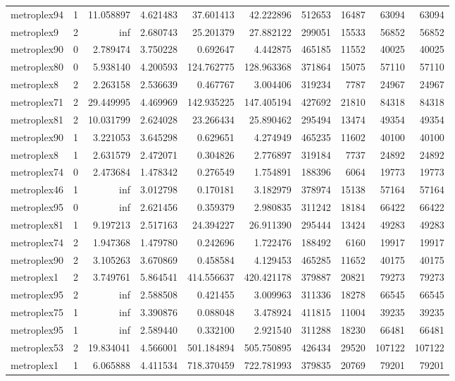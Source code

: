 \begin{longtable}{|l|r|r|r|r|r|r|r|r|r|}
metroplex94 & 1 & 11.058897 & 4.621483 & 37.601413 & 42.222896 & 512653 & 16487 & 63094 & 63094 \\
metroplex9 & 2 & inf & 2.680743 & 25.201379 & 27.882122 & 299051 & 15533 & 56852 & 56852 \\
metroplex90 & 0 & 2.789474 & 3.750228 & 0.692647 & 4.442875 & 465185 & 11552 & 40025 & 40025 \\
metroplex80 & 0 & 5.938140 & 4.200593 & 124.762775 & 128.963368 & 371864 & 15075 & 57110 & 57110 \\
metroplex8 & 2 & 2.263158 & 2.536639 & 0.467767 & 3.004406 & 319234 & 7787 & 24967 & 24967 \\
metroplex71 & 2 & 29.449995 & 4.469969 & 142.935225 & 147.405194 & 427692 & 21810 & 84318 & 84318 \\
metroplex81 & 2 & 10.031799 & 2.624028 & 23.266434 & 25.890462 & 295494 & 13474 & 49354 & 49354 \\
metroplex90 & 1 & 3.221053 & 3.645298 & 0.629651 & 4.274949 & 465235 & 11602 & 40100 & 40100 \\
metroplex8 & 1 & 2.631579 & 2.472071 & 0.304826 & 2.776897 & 319184 & 7737 & 24892 & 24892 \\
metroplex74 & 0 & 2.473684 & 1.478342 & 0.276549 & 1.754891 & 188396 & 6064 & 19773 & 19773 \\
metroplex46 & 1 & inf & 3.012798 & 0.170181 & 3.182979 & 378974 & 15138 & 57164 & 57164 \\
metroplex95 & 0 & inf & 2.621456 & 0.359379 & 2.980835 & 311242 & 18184 & 66422 & 66422 \\
metroplex81 & 1 & 9.197213 & 2.517163 & 24.394227 & 26.911390 & 295444 & 13424 & 49283 & 49283 \\
metroplex74 & 2 & 1.947368 & 1.479780 & 0.242696 & 1.722476 & 188492 & 6160 & 19917 & 19917 \\
metroplex90 & 2 & 3.105263 & 3.670869 & 0.458584 & 4.129453 & 465285 & 11652 & 40175 & 40175 \\
metroplex1 & 2 & 3.749761 & 5.864541 & 414.556637 & 420.421178 & 379887 & 20821 & 79273 & 79273 \\
metroplex95 & 2 & inf & 2.588508 & 0.421455 & 3.009963 & 311336 & 18278 & 66545 & 66545 \\
metroplex75 & 1 & inf & 3.390876 & 0.088048 & 3.478924 & 411815 & 11004 & 39235 & 39235 \\
metroplex95 & 1 & inf & 2.589440 & 0.332100 & 2.921540 & 311288 & 18230 & 66481 & 66481 \\
metroplex53 & 2 & 19.834041 & 4.566001 & 501.184894 & 505.750895 & 426434 & 29520 & 107122 & 107122 \\
metroplex1 & 1 & 6.065888 & 4.411534 & 718.370459 & 722.781993 & 379835 & 20769 & 79201 & 79201 \\
\end{longtable}
